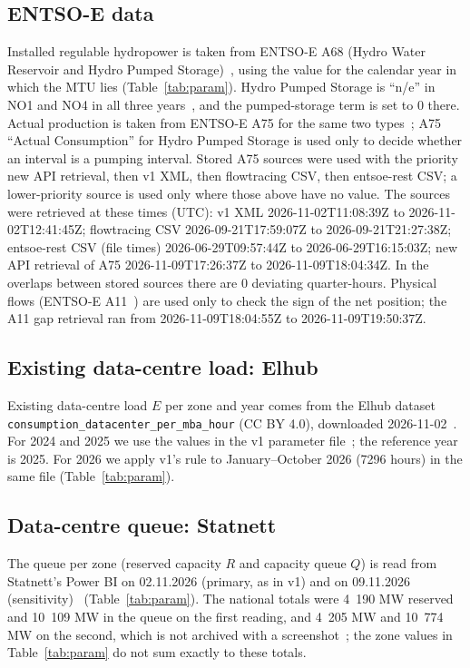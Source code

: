 \subsection{ENTSO-E data}
Installed regulable hydropower is taken from ENTSO-E A68 (Hydro Water Reservoir and Hydro Pumped Storage)~\cite{entsoe}, using the value for the calendar year in which the MTU lies (Table~\ref{tab:param}). %
Hydro Pumped Storage is ``n/e'' in NO1 and NO4 in all three years~\cite{entsoe}, and the pumped-storage term is set to 0 there. %
Actual production is taken from ENTSO-E A75 for the same two types~\cite{entsoe}; A75 ``Actual Consumption'' for Hydro Pumped Storage is used only to decide whether an interval is a pumping interval. %
Stored A75 sources were used with the priority new API retrieval, then v1 XML, then flowtracing CSV, then entsoe-rest CSV; a lower-priority source is used only where those above have no value. %
The sources were retrieved at these times (UTC):
v1 XML 2026-11-02T11:08:39Z to 2026-11-02T12:41:45Z; %
flowtracing CSV 2026-09-21T17:59:07Z to 2026-09-21T21:27:38Z; %
entsoe-rest CSV (file times) 2026-06-29T09:57:44Z to 2026-06-29T16:15:03Z; %
new API retrieval of A75 2026-11-09T17:26:37Z to 2026-11-09T18:04:34Z. %
In the overlaps between stored sources there are 0 deviating quarter-hours. %
Physical flows (ENTSO-E A11~\cite{entsoe}) are used only to check the sign of the net position; the A11 gap retrieval ran from 2026-11-09T18:04:55Z to 2026-11-09T19:50:37Z. %

\subsection{Existing data-centre load: Elhub}
Existing data-centre load $E$ per zone and year comes from the Elhub dataset \nolinkurl{consumption_datacenter_per_mba_hour} (CC BY 4.0), downloaded 2026-11-02~\cite{elhub}. %
For 2024 and 2025 we use the values in the v1 parameter file~\cite{v1}; the reference year is 2025. %
For 2026 we apply v1's rule to January--October 2026 (7296 hours) in the same file (Table~\ref{tab:param}). %

\subsection{Data-centre queue: Statnett}
The queue per zone (reserved capacity $R$ and capacity queue $Q$) is read from Statnett's Power BI on 02.11.2026 (primary, as in v1) and on 09.11.2026 (sensitivity)~\cite{pbi} (Table~\ref{tab:param}). %
The national totals were 4~190 MW reserved and 10~109 MW in the queue on the first reading, and 4~205 MW and 10~774 MW on the second, which is not archived with a screenshot~\cite{pbi}; the zone values in Table~\ref{tab:param} do not sum exactly to these totals. %

